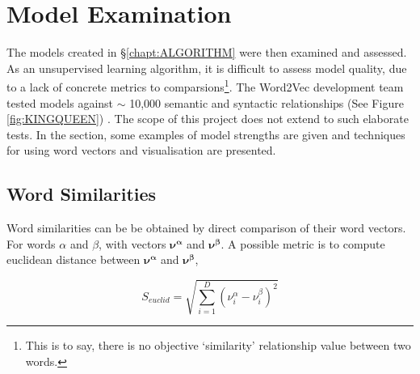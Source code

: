 \chapter{Model Examination}
\label{chapt:VALIDATION}
The models created in  \S\ref{chapt:ALGORITHM} were then examined and assessed. As an unsupervised learning algorithm, it is difficult to assess model quality, due to a lack of concrete metrics to comparsions\footnote{This is to say, there is no objective `similarity' relationship value between two words.}. The Word2Vec development team tested models against $\sim$ 10,000 semantic and syntactic relationships (See Figure \ref{fig:KINGQUEEN})\cite{word2vec1} \cite{word2vec2} \cite{word2veckingqueen}. The scope of this project does not extend to such elaborate tests. In the section, some examples of model strengths are given and techniques for using word vectors and visualisation are presented. 
\section{Word Similarities}
Word similarities can be be obtained by direct comparison of their word vectors. For words $\alpha$ and $\beta$, with vectors $\mathbf{\nu^\alpha}$ and $\mathbf{\nu^\beta}$.  A possible metric is to compute euclidean distance between $\mathbf{\nu^\alpha}$ and $\mathbf{\nu^\beta}$, 

$$S_{euclid} = \sqrt{\sum_{i=1}^{D}(\nu_i^{\alpha}-\nu_i^{\beta})^{2}} $$

